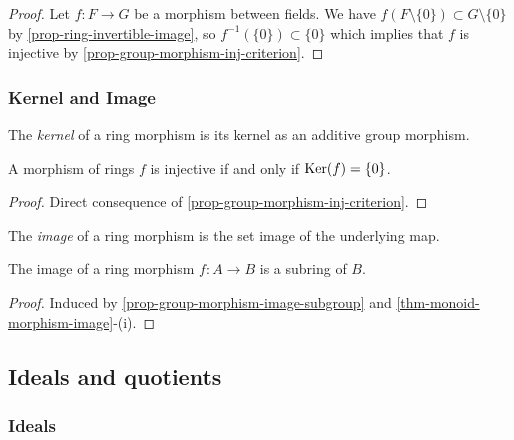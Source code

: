 \documentclass[12pt]{report}
\begin{document}
\begin{proof}
    Let $f \colon F \to G$ be a morphism between fields. We have $f(F \setminus \lbrace 0 \rbrace) \subset G \setminus \lbrace 0 \rbrace$ by \ref{prop-ring-invertible-image}, so $f^{-1}(\lbrace 0 \rbrace) \subset \lbrace 0 \rbrace$ which implies that $f$ is injective by \ref{prop-group-morphism-inj-criterion}.
\end{proof}

\subsubsection{Kernel and Image}

\begin{definition} \label{def-ring-morphism-kernel}
    The \emph{kernel} of a ring morphism is its kernel as an additive group morphism.
\end{definition}

\begin{proposition} \label{prop-ring-morphism-inj-criterion}
    A morphism of rings $f$ is injective if and only if $\operatorname{Ker} (f) = \lbrace 0 \rbrace$.
\end{proposition}

\begin{proof}
    Direct consequence of \ref{prop-group-morphism-inj-criterion}.
\end{proof}

\begin{definition} \label{def-ring-morphism-image}
    The \emph{image} of a ring morphism is the set image of the underlying map.
\end{definition}

\begin{proposition} \label{prop-ring-morphism-image-subring}
    The image of a ring morphism $f \colon A \to B$ is a subring of $B$.
\end{proposition}

\begin{proof}
    Induced by \ref{prop-group-morphism-image-subgroup} and \ref{thm-monoid-morphism-image}-(i).
\end{proof}

\subsection{Ideals and quotients}
\subsubsection{Ideals}
\end{document}

